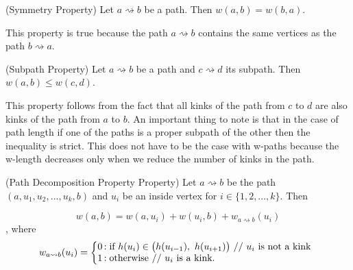 



\begin{defn} (Symmetry Property) Let $a \rightsquigarrow b$ be a path. Then $w(a, b) = w(b, a)$. \end{defn}

This property is true because the path $a \rightsquigarrow b$ contains the same vertices as the path $b \rightsquigarrow a$.

\begin{defn} (Subpath Property) Let $a \rightsquigarrow b$ be a path and $c \rightsquigarrow d$ its subpath. Then $w(a, b) \le w(c, d)$. \end{defn}

This property follows from the fact that all kinks of the path from $c$ to $d$ are also kinks of the path from $a$ to $b$. An important thing to note is that in the case of path length if one of the paths is a proper subpath of the other then the inequality is strict. This does not have to be the case with w-paths because the w-length decreases only when we reduce the number of kinks in the path.

\begin{defn} (Path Decomposition Property Property) Let $a \rightsquigarrow b$ be the path $(a, u_1, u_2, ..., u_k, b)$ and $u_i$ be an inside vertex for $i \in \{1, 2, ..., k\}$. Then \end{defn}

$$w(a, b) = w(a, u_i) + w(u_i, b) + w_{a \rightsquigarrow b}(u_i)$$
, where
$$
w_{a \rightsquigarrow b}(u_i) = \left\{
   \begin{array}{@{}l@{\thinspace}l}
       \text{0}  &: \text{if } h(u_i) \in \big(h(u_{i-1}),~h(u_{i+1}) \big) \text{ // $u_i$ is not a kink} \\
       \text{1} &: \text{otherwise // $u_i$ is a kink.} \\
   \end{array}
\right.
$$

